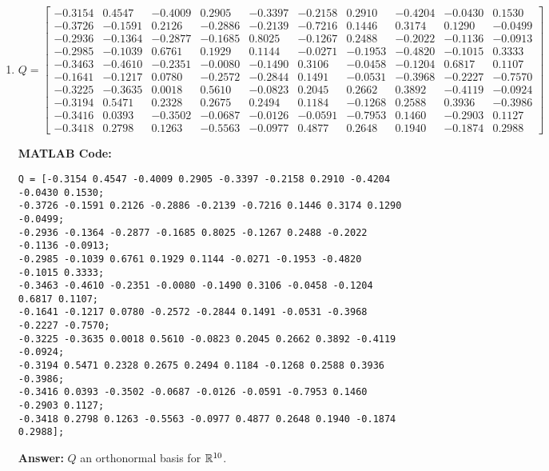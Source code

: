 \documentclass{ximera}
\begin{document}
\begin{example}
\begin{enumerate}
\item \[
Q = \begin{bmatrix} 
-0.3154 & 0.4547 & -0.4009 & 0.2905 & -0.3397 & -0.2158 & 0.2910 & -0.4204 & -0.0430 & 0.1530 \\
-0.3726 & -0.1591 & 0.2126 & -0.2886 & -0.2139 & -0.7216 & 0.1446 & 0.3174 & 0.1290 & -0.0499 \\
-0.2936 & -0.1364 & -0.2877 & -0.1685 & 0.8025 & -0.1267 & 0.2488 & -0.2022 & -0.1136 & -0.0913 \\
-0.2985 & -0.1039 & 0.6761 & 0.1929 & 0.1144 & -0.0271 & -0.1953 & -0.4820 & -0.1015 & 0.3333 \\
-0.3463 & -0.4610 & -0.2351 & -0.0080 & -0.1490 & 0.3106 & -0.0458 & -0.1204 & 0.6817 & 0.1107 \\
-0.1641 & -0.1217 & 0.0780 & -0.2572 & -0.2844 & 0.1491 & -0.0531 & -0.3968 & -0.2227 & -0.7570 \\
-0.3225 & -0.3635 & 0.0018 & 0.5610 & -0.0823 & 0.2045 & 0.2662 & 0.3892 & -0.4119 & -0.0924 \\
-0.3194 & 0.5471 & 0.2328 & 0.2675 & 0.2494 & 0.1184 & -0.1268 & 0.2588 & 0.3936 & -0.3986 \\
-0.3416 & 0.0393 & -0.3502 & -0.0687 & -0.0126 & -0.0591 & -0.7953 & 0.1460 & -0.2903 & 0.1127 \\
-0.3418 & 0.2798 & 0.1263 & -0.5563 & -0.0977 & 0.4877 & 0.2648 & 0.1940 & -0.1874 & 0.2988
\end{bmatrix}
\]

\textbf{MATLAB Code:}
\begin{verbatim}
Q = [-0.3154 0.4547 -0.4009 0.2905 -0.3397 -0.2158 0.2910 -0.4204 -0.0430 0.1530;
-0.3726 -0.1591 0.2126 -0.2886 -0.2139 -0.7216 0.1446 0.3174 0.1290 -0.0499;
-0.2936 -0.1364 -0.2877 -0.1685 0.8025 -0.1267 0.2488 -0.2022 -0.1136 -0.0913;
-0.2985 -0.1039 0.6761 0.1929 0.1144 -0.0271 -0.1953 -0.4820 -0.1015 0.3333;
-0.3463 -0.4610 -0.2351 -0.0080 -0.1490 0.3106 -0.0458 -0.1204 0.6817 0.1107;
-0.1641 -0.1217 0.0780 -0.2572 -0.2844 0.1491 -0.0531 -0.3968 -0.2227 -0.7570;
-0.3225 -0.3635 0.0018 0.5610 -0.0823 0.2045 0.2662 0.3892 -0.4119 -0.0924;
-0.3194 0.5471 0.2328 0.2675 0.2494 0.1184 -0.1268 0.2588 0.3936 -0.3986;
-0.3416 0.0393 -0.3502 -0.0687 -0.0126 -0.0591 -0.7953 0.1460 -0.2903 0.1127;
-0.3418 0.2798 0.1263 -0.5563 -0.0977 0.4877 0.2648 0.1940 -0.1874 0.2988];
\end{verbatim}

\textbf{Answer:}
$Q$  an orthonormal basis for $\mathbb{R}^{10}$.

\end{enumerate}

\end{example}
\end{document}
